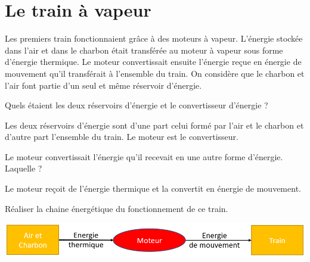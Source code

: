 \section{Le train à vapeur}\label{ex:train}

Les premiers train fonctionnaient grâce à des moteurs à vapeur. 
L'énergie stockée dans l'air et 
dans le charbon était transférée au moteur à vapeur sous forme d'énergie thermique.
Le moteur convertissait ensuite l'énergie reçue en énergie de mouvement qu'il transférait à l'ensemble du train. On considère que le charbon et l'air font partie d'un seul et même  réservoir d'énergie.

\begin{questions}
	\question Quels étaient les deux réservoirs d'énergie et le convertisseur d'énergie ?
		\begin{solution}
			Les deux réservoirs d'énergie sont d'une part celui formé par l'air et le charbon et d'autre part l'ensemble du train. Le moteur est le convertisseur.
		\end{solution}
	
	\question Le moteur convertissait l'énergie qu'il recevait en une autre forme d'énergie. Laquelle ?
		\begin{solution}
			Le moteur reçoit de l'énergie thermique et la convertit en énergie de mouvement.
		\end{solution}
	
	\question Réaliser la chaine énergétique du fonctionnement de ce train. 
		\begin{solution}
			\begin{center}
				\includegraphics[scale=0.6]{img/chaine_train}
			\end{center}
		\end{solution}
		
\end{questions}